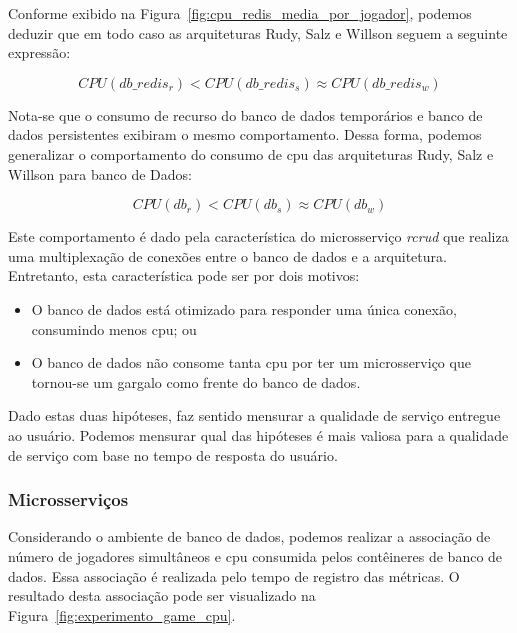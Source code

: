 Conforme exibido na Figura~\ref{fig:cpu_redis_media_por_jogador}, podemos deduzir que em todo caso as arquiteturas Rudy, Salz e Willson seguem a seguinte expressão:

$$
    CPU(db\_redis_{r}) < CPU(db\_redis_{s}) \approx CPU(db\_redis_{w})
$$

Nota-se que o consumo de recurso do banco de dados temporários e banco de dados persistentes exibiram o mesmo comportamento.
%
Dessa forma, podemos generalizar o comportamento do consumo de \ac{cpu} das arquiteturas Rudy, Salz e Willson para banco de Dados:

$$
    CPU(db_{r}) < CPU(db_{s}) \approx CPU(db_{w})
$$

Este comportamento é dado pela característica do microsserviço \textit{rcrud} que realiza uma multiplexação de conexões entre o banco de dados e a arquitetura.
%
Entretanto, esta característica pode ser por dois motivos:

\begin{itemize}
 \item O banco de dados está otimizado para responder uma única conexão, consumindo menos \ac{cpu}; ou
 \item O banco de dados não consome tanta \ac{cpu} por ter um microsserviço que tornou-se um gargalo como frente do banco de dados.
\end{itemize}

Dado estas duas hipóteses, faz sentido mensurar a qualidade de serviço entregue ao usuário.
%
Podemos mensurar qual das hipóteses é mais valiosa para a qualidade de serviço com base no tempo de resposta do usuário.


\subsubsection{Microsserviços}

Considerando o ambiente de banco de dados, podemos realizar a associação de número de jogadores simultâneos e \ac{cpu} consumida pelos contêineres de banco de dados.
%
Essa associação é realizada pelo tempo de registro das métricas.
%
O resultado desta associação pode ser visualizado na Figura~\ref{fig:experimento_game_cpu}.

